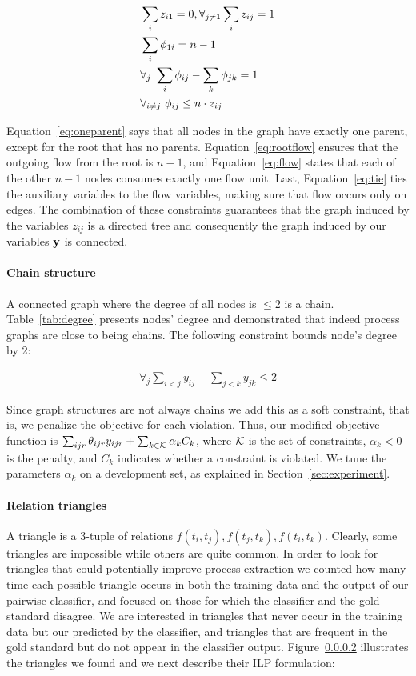 \begin{align}
\small &\sum_{i} z_{i1} =0, \forall_{j \neq 1} \sum_{i} z_{ij}=1 \label{eq:oneparent} \\ 
&\sum_{i} \phi_{1i}=n-1 \label{eq:rootflow} \\ 
&\forall_{j} \ \sum_{i} \phi_{ij} - \sum_{k} \phi_{jk}=1 \label{eq:flow} \\
&\forall_{i \neq j} \ \phi_{ij} \leq n \cdot z_{ij} \label{eq:tie} 
\end{align}

Equation~\ref{eq:oneparent} says that all nodes in the graph have exactly one parent, except for the root that has no parents. Equation~\ref{eq:rootflow} ensures that the outgoing flow from the root is $n-1$, and Equation~\ref{eq:flow} states that each of the other $n-1$ nodes consumes exactly one flow unit. Last, Equation~\ref{eq:tie} ties the auxiliary variables to the flow variables, making sure that flow occurs only on edges. The combination of these constraints guarantees that the graph induced by the variables $z_{ij}$ is a directed tree and consequently the graph induced by our variables $\mathbf{y}$ is connected.

\paragraph{Chain structure} 
A connected graph where the degree of all nodes is $\leq 2$ is a chain. Table~\ref{tab:degree} presents nodes' degree and demonstrated that indeed process graphs are close to being chains. The following constraint bounds node's degree by 2:

\begin{align}
\forall_j \sum_{i<j} y_{ij} + \sum_{j<k} y_{jk} \leq 2
\end{align}

Since graph structures are not always chains we add this as a soft constraint, that is, we penalize the objective for each violation. Thus, our modified objective function is $\sum_{ijr} \theta_{ijr} y_{ijr} + \sum_{k \in \mathcal{K}} \alpha_k C_k$, where $\mathcal{K}$ is the set of constraints, $\alpha_k<0$ is the penalty, and $C_k$ indicates whether a constraint is violated. We tune the parameters $\alpha_k$ on a development set, as explained in Section~\ref{sec:experiment}.

\paragraph{Relation triangles} 
A triangle is a 3-tuple of relations $f(t_i,t_j),f(t_j,t_k),f(t_i,t_k)$. Clearly, some triangles are impossible while others are quite common. In order to look for triangles that could potentially improve process extraction we counted how many time each possible triangle occurs in both the training data and the output of our pairwise classifier, and focused on those for which the classifier and the gold standard disagree. We are interested in triangles that never occur in the training data but our predicted by the classifier, and triangles that are frequent in the gold standard but do not appear in the classifier output. Figure~\ref{} illustrates the triangles we found and we next describe their ILP formulation:

